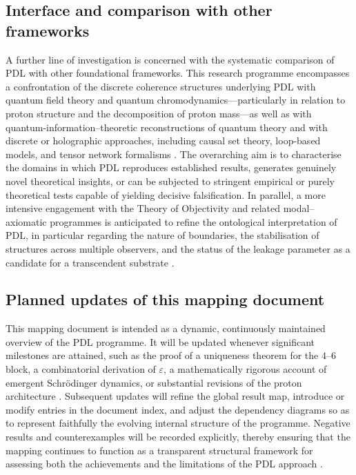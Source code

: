 \documentclass[11pt,a4paper]{article}
\begin{document}
\subsection{Interface and comparison with other frameworks}
\label{subsec:roadmap_interface}

A further line of investigation is concerned with the systematic comparison of PDL with other foundational frameworks. This research programme encompasses a confrontation of the discrete coherence structures underlying PDL with quantum field theory and quantum chromodynamics—particularly in relation to proton structure and the decomposition of proton mass—as well as with quantum-information–theoretic reconstructions of quantum theory and with discrete or holographic approaches, including causal set theory, loop-based models, and tensor network formalisms \citep{PDL_intro,PDL_position}. The overarching aim is to characterise the domains in which PDL reproduces established results, generates genuinely novel theoretical insights, or can be subjected to stringent empirical or purely theoretical tests capable of yielding decisive falsification. In parallel, a more intensive engagement with the Theory of Objectivity and related modal–axiomatic programmes is anticipated to refine the ontological interpretation of PDL, in particular regarding the nature of boundaries, the stabilisation of structures across multiple observers, and the status of the leakage parameter as a candidate for a transcendent substrate \citep{PDL_TO_dialogue,PDL_position}.

\subsection{Planned updates of this mapping document}
\label{subsec:roadmap_mapping}

This mapping document is intended as a dynamic, continuously maintained overview of the PDL programme. It will be updated whenever significant milestones are attained, such as the proof of a uniqueness theorem for the $4$--$6$ block, a combinatorial derivation of $\varepsilon$, a mathematically rigorous account of emergent Schr\"odinger dynamics, or substantial revisions of the proton architecture \citep{PDL_position}. Subsequent updates will refine the global result map, introduce or modify entries in the document index, and adjust the dependency diagrams so as to represent faithfully the evolving internal structure of the programme. Negative results and counterexamples will be recorded explicitly, thereby ensuring that the mapping continues to function as a transparent structural framework for assessing both the achievements and the limitations of the PDL approach \citep{PDL_position}.
\end{document}
